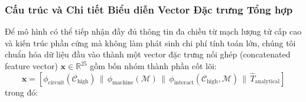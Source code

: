 \documentclass[11pt, a4paper]{article}
\begin{document}
\subsubsection{Cấu trúc và Chi tiết Biểu diễn Vector Đặc trưng Tổng hợp}
Để mô hình có thể tiếp nhận đầy đủ thông tin đa chiều từ mạch lượng tử cấp cao và kiến trúc phần cứng mà không làm phát sinh chi phí tính toán lớn, chúng tôi chuẩn hóa dữ liệu đầu vào thành một vector đặc trưng nối ghép (concatenated feature vector) $\mathbf{x} \in \mathbb{R}^{25}$ gồm bốn nhóm thành phần cốt lõi:
\begin{equation}
    \mathbf{x} = \left[ \phi_{\text{circuit}}(\mathcal{C}_{\text{high}}) \,\|\, \phi_{\text{machine}}(\mathcal{M}) \,\|\, \phi_{\text{interact}}(\mathcal{C}_{\text{high}}, \mathcal{M}) \,\|\, \hat{T}_{\text{analytical}} \right]
\end{equation}
trong đó:
\end{document}
